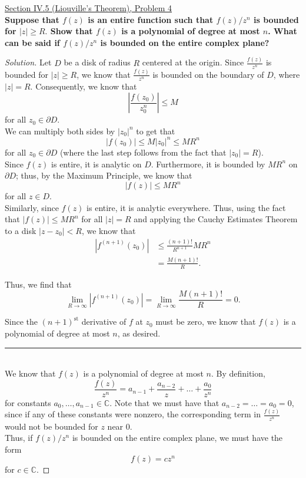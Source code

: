 \documentclass[11pt]{article}
\newenvironment{solution}
  {\renewcommand\qedsymbol{$\blacksquare$}\begin{proof}[Solution]}
  {\end{proof}}
\theoremstyle{definition}
\begin{document}
\newpage

\underline{Section IV.5 (Liouville's Theorem), Problem 4} \\

\textbf{Suppose that $f(z)$ is an entire function such that $f(z)/z^n$ is bounded for $|z| \geq R.$ Show that $f(z)$ is a polynomial of degree at most $n$. What can be said
if $f(z)/z^n$ is bounded on the entire complex plane?}

\begin{solution}
Let $D$ be a disk of radius $R$ centered at the origin. Since $\frac{f(z)}{z^n}$ is bounded for $|z| \geq R$, we know that $\frac{f(z)}{z^n}$ is bounded on the boundary of $D$, where $|z| = R$.
Consequently, we know that \[ \left|\frac{f(z_0)}{z_0^n}\right|  \leq M\] for all $z_0 \in \partial D$. \\

We can multiply both sides by $|z_0|^n$ to get that \[ |f(z_0)| \leq M |z_0|^n \leq MR^n \] for all $z_0 \in \partial D$ (where the last step follows from the fact that $|z_0| = R$). \\


Since $f(z)$ is entire, it is analytic on $D$. Furthermore, it is bounded by $MR^n$ on $\partial D$; thus, by the Maximum Principle, we know that
\[ |f(z)| \leq MR^n\] for all $z \in D$. \\

Similarly, since $f(z)$ is entire, it is analytic everywhere. Thus, using the fact that $|f(z)| \leq MR^n$ for all $|z| = R$ and applying the Cauchy Estimates Theorem to a disk $|z-z_0| < R$,  we know that
\begin{align*} \left| f^{(n+1)}(z_0) \right| &\leq \frac{(n+1)!}{R^{n+1}}MR^n \\
&= \frac{M(n+1)!}{R}.\end{align*}

Thus, we find that
\[ \lim \limits_{R \rightarrow \infty} \left| f^{(n+1)}(z_0) \right| = \lim \limits_{R \rightarrow \infty}  \frac{M(n+1)!}{R} = 0.\]

Since the $(n+1)^{\text{st}}$ derivative of $f$ at $z_0$ must be zero, we know that $f(z)$ is a polynomial of degree at most $n$, as desired. \\

\noindent\rule{\textwidth}{1pt} \\

We know that $f(z)$ is a polynomial of degree at most $n$. By definition,
\[ \frac{f(z)}{z^n} = a_{n-1} + \frac{a_{n-2}}{z} + \dots + \frac{a_0}{z^n} \]
for constants $a_0, \dots, a_{n-1} \in \mathbb{C}$. Note that we must have that $a_{n-2} = \dots = a_0 = 0$, since if any of these constants were nonzero, the corresponding term in
$\frac{f(z)}{z^n}$ would not be bounded for $z$ near $0$. \\

Thus, if $f(z)/z^n$ is bounded on the entire complex plane, we must have the form \[\boxed{f(z) = cz^n}\] for $c \in \mathbb{C}$.


\end{solution}
\end{document}
